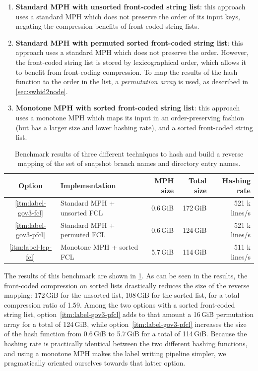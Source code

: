 \begin{enumerate}
    \item \label{itm:label-gov3-fcl}
        \textbf{Standard \gls{MPH} with unsorted front-coded string list}: this
        approach uses a standard \gls{MPH} which does not preserve the order of
        its input keys, negating the compression benefits of front-coded string
        lists.
    \item \label{itm:label-gov3-pfcl}
        \textbf{Standard \gls{MPH} with permuted sorted front-coded string
        list}: this approach uses a standard \gls{MPH} which does not preserve
        the order. However, the front-coded string list is stored by
        lexicographical order, which allows it to benefit from front-coding
        compression. To map the results of the hash function to the order in
        the list, a \emph{permutation array} is used, as described in
        \cref{sec:swhid2node}.
    \item \label{itm:label-lcp-fcl}
        \textbf{Monotone \gls{MPH} with sorted front-coded string list}: this
        approach uses a monotone \gls{MPH} which maps its input in an
        order-preserving fashion (but has a larger size and lower hashing
        rate), and a sorted front-coded string list.
\end{enumerate}

\begin{table}[b]
    \centering
    \caption{Benchmark results of three different techniques to hash and build
        a reverse mapping of the set of snapshot branch names and directory
        entry names.}%
    \label{tab:label-mph-benchmark}
    \begin{tabular}{c l r r r}
        \textbf{Option} & \textbf{Implementation} & \textbf{MPH size} & \textbf{Total size} & \textbf{Hashing rate} \\ \hline
        \ref{itm:label-gov3-fcl} & Standard MPH + unsorted FCL & 0.6\,GiB & 172\,GiB & 521 k lines/s \\
        \ref{itm:label-gov3-pfcl} & Standard MPH + permuted FCL & 0.6\,GiB & 124\,GiB & 521 k lines/s \\
        \ref{itm:label-lcp-fcl} & Monotone MPH + sorted FCL & 5.7\,GiB & 114\,GiB & 511 k lines/s
    \end{tabular}
\end{table}

The results of this benchmark are shown in \cref{tab:label-mph-benchmark}. As
can be seen in the results, the front-coded compression on sorted lists
drastically reduces the size of the reverse mapping: 172\,GiB for the unsorted
list, 108\,GiB for the sorted list, for a total compression ratio of 1.59.
Among the two options with a sorted front-coded string list,
option~\ref{itm:label-gov3-pfcl} adds to that amount a 16\,GiB permutation
array for a total of 124\,GiB, while option~\ref{itm:label-gov3-pfcl} increases
the size of the hash function from 0.6\,GiB to 5.7\,GiB for a total of
114\,GiB. Because the hashing rate is practically identical between the two
different hashing functions, and using a monotone \gls{MPH} makes the label
writing pipeline simpler, we pragmatically oriented ourselves towards that
latter option.

